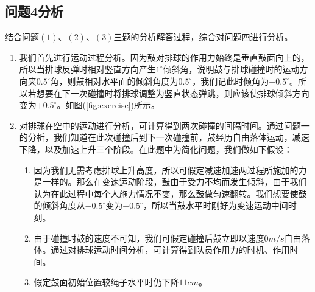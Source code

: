\documentclass{cumcm}
\begin{document}
\subsection{问题4分析}
结合问题$(1)$、$(2)$、$(3)$三题的分析解答过程，综合对问题四进行分析。
\begin{enumerate}
\item 我们首先进行运动过程分析。因为鼓对排球的作用力始终是垂直鼓面向上的，所以当排球反弹时相对竖直方向产生$1^{\circ}$倾斜角，说明鼓与排球碰撞时的运动方向夹$0.5^{\circ}$角，则鼓相对水平面的倾斜角度为$0.5^{\circ}$，我们记此时倾角为$-0.5^{\circ}$。所以若想要在下一次碰撞时将排球调整为竖直状态弹跳，则应该使排球倾斜方向变为$+0.5^{\circ}$。如图(\ref{fig:exercise})所示。
\item 对排球在空中的运动进行分析，可计算得到两次碰撞的间隔时间。通过问题一的分析，我们知道在此次碰撞后到下一次碰撞前，鼓经历自由落体运动，减速下降，以及加速上升三个阶段。在此题中为简化问题，我们做如下假设：
\begin{enumerate}
\item 因为我们无需考虑排球上升高度，所以可假定减速加速两过程所施加的力是一样的。那么在变速运动阶段，鼓由于受力不均而发生倾斜，由于我们认为在此过程中每个人施力情况不变，那么鼓做匀速翻转。我们想要使鼓的倾斜角度从$-0.5^{\circ}$变为$+0.5^{\circ}$，所以当鼓水平时刚好为变速运动中间时刻。
\item 由于碰撞时鼓的速度不可知，我们可假定碰撞后鼓立即以速度$0m/s$自由落体。通过对排球运动时间分析，可计算得到队员作用力的时机、作用时间。
\item 假定鼓面初始位置较绳子水平时仍下降$11cm$。
\end{enumerate}


\end{enumerate}
\end{document}
